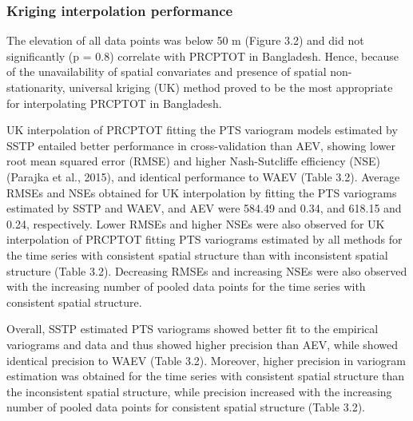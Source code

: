 \subsubsection{Kriging interpolation performance}
\label{Kriging interpolation performance}

The elevation of all data points was below 50 m (Figure 3.2) and did not significantly (p = 0.8) correlate with PRCPTOT in Bangladesh. Hence, because of the unavailability of spatial convariates and presence of spatial non-stationarity, universal kriging (UK) method proved to be the most appropriate for interpolating PRCPTOT in Bangladesh.

UK interpolation of PRCPTOT fitting the PTS variogram models estimated by SSTP entailed better performance in cross-validation than AEV, showing lower root mean squared error (RMSE) and higher Nash-Sutcliffe efficiency (NSE) (Parajka et al., 2015), and identical performance to WAEV (Table 3.2). Average RMSEs and NSEs obtained for UK interpolation by fitting the PTS variograms estimated by SSTP and WAEV, and AEV  were 584.49 and 0.34, and 618.15 and 0.24, respectively. Lower RMSEs and higher NSEs were also observed for UK interpolation of PRCPTOT fitting PTS variograms estimated by all methods for the time series with consistent spatial structure than with inconsistent spatial structure (Table 3.2). Decreasing RMSEs and increasing NSEs were also observed with the increasing number of pooled data points for the time series with consistent spatial structure.

Overall, SSTP estimated PTS variograms showed better fit to the empirical variograms and data and thus showed higher precision than AEV, while showed identical precision to WAEV (Table 3.2). Moreover, higher precision in variogram estimation was obtained for the time series with consistent spatial structure than the inconsistent spatial structure, while precision increased with the increasing number of pooled data points for consistent spatial structure (Table 3.2).

